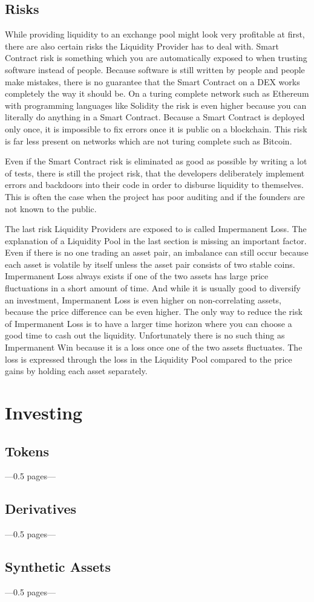 \subsection{Risks}
While providing liquidity to an exchange pool might look very profitable at first, there are also certain risks the Liquidity Provider has to deal with. Smart Contract risk is something which you are automatically exposed to when trusting software instead of people. Because software is still written by people and people make mistakes, there is no guarantee that the Smart Contract on a DEX works completely the way it should be. On a turing complete network such as Ethereum with programming languages like Solidity the risk is even higher because you can literally do anything in a Smart Contract. Because a Smart Contract is deployed only once, it is impossible to fix errors once it is public on a blockchain. This risk is far less present on networks which are not turing complete such as Bitcoin.

Even if the Smart Contract risk is eliminated as good as possible by writing a lot of tests, there is still the project risk, that the developers deliberately implement errors and backdoors into their code in order to disburse liquidity to themselves. This is often the case when the project has poor auditing and if the founders are not known to the public.

The last risk Liquidity Providers are exposed to is called Impermanent Loss. The explanation of a Liquidity Pool in the last section is missing an important factor. Even if there is no one trading an asset pair, an imbalance can still occur because each asset is volatile by itself unless the asset pair consists of two stable coins. Impermanent Loss always exists if one of the two assets has large price fluctuations in a short amount of time. And while it is usually good to diversify an investment, Impermanent Loss is even higher on non-correlating assets, because the price difference can be even higher. The only way to reduce the risk of Impermanent Loss is to have a larger time horizon where you can choose a good time to cash out the liquidity. Unfortunately there is no such thing as Impermanent Win because it is a loss once one of the two assets fluctuates. The loss is expressed through the loss in the Liquidity Pool compared to the price gains by holding each asset separately.

\section{Investing}
\subsection{Tokens}
---0.5 pages---
\subsection{Derivatives}
---0.5 pages---
\subsection{Synthetic Assets}
---0.5 pages---

